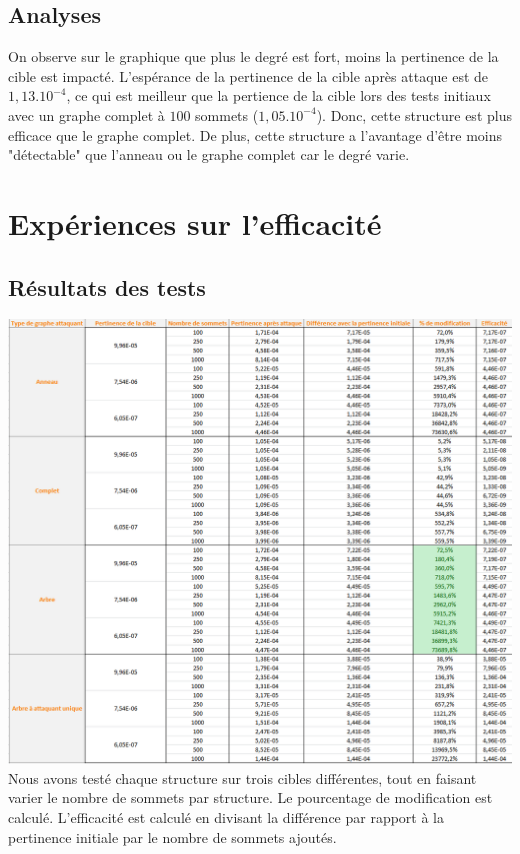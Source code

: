 \documentclass[a4paper,11pt]{article}
\begin{document}
	\subsection{Analyses}
		On observe sur le graphique que plus le degré est fort, moins la pertinence de la cible est impacté. L'espérance de la pertinence de la cible après attaque est de $1,13.10^{-4}$, ce qui est meilleur que la pertience de la cible lors des tests initiaux avec un graphe complet à $100$ sommets ($1,05.10^{-4}$). Donc, cette structure est plus efficace que le graphe complet. De plus, cette structure a l'avantage d'être moins "détectable" que l'anneau ou le graphe complet car le degré varie.
	

\section{Expériences sur l'efficacité}
	
	\subsection{Résultats des tests}
		\includegraphics[scale = 0.5]{Captures/ranking5.PNG}\\
		Nous avons testé chaque structure sur trois cibles différentes, tout en faisant varier le nombre de sommets par structure. 
		Le pourcentage de modification est calculé. L'efficacité est calculé en divisant la différence par rapport à la pertinence initiale par le nombre de sommets ajoutés.
\end{document}
